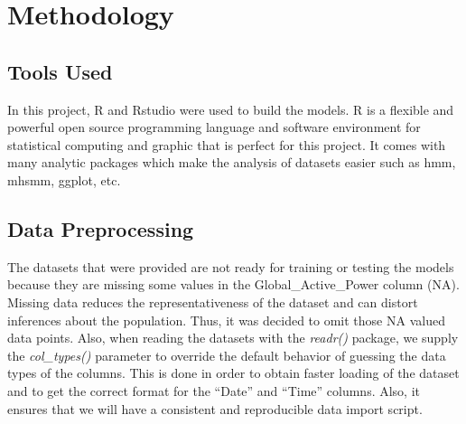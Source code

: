 \documentclass[letterpaper, 11pt]{article}%
\begin{document}
\section{Methodology}
\subsection{Tools Used}
In this project, R and Rstudio were used to build the models. R is a flexible and powerful open source programming language and software environment for statistical computing and graphic that is perfect for this project\cite{r}. It comes with many analytic packages which make the analysis of datasets easier such as hmm, mhsmm, ggplot, etc.

\subsection{Data Preprocessing}
The datasets that were provided are not ready for training or testing the models because they are missing some values in the Global\_Active\_Power column (NA). Missing data reduces the representativeness of the dataset and can distort inferences about the population\cite{missing}. Thus, it was decided to omit those NA valued data points. Also, when reading the datasets with the \textit{readr()} package, we supply the \textit{col\_types()} parameter to override the default behavior of guessing the data types of the columns. This is done in order to obtain faster loading of the dataset and to get the correct format for the ``Date'' and ``Time'' columns. Also, it ensures that we will have a consistent and reproducible data import script\cite{datascience}.
\end{document}
